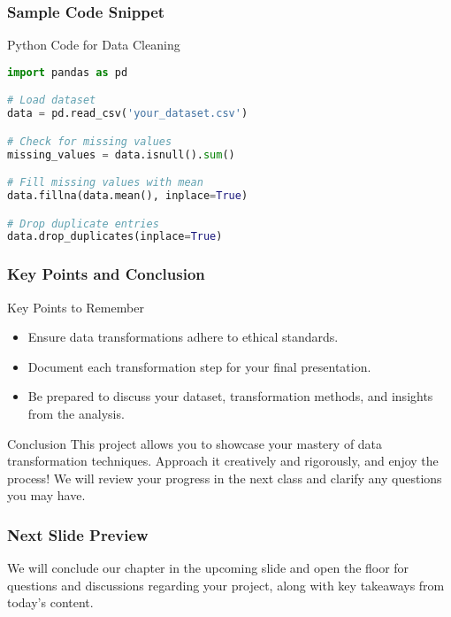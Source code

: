 \documentclass[aspectratio=169]{beamer}
\begin{document}
\begin{frame}[fragile]
    \frametitle{Sample Code Snippet}
    \begin{block}{Python Code for Data Cleaning}
        \begin{lstlisting}[language=Python]
import pandas as pd

# Load dataset
data = pd.read_csv('your_dataset.csv')

# Check for missing values
missing_values = data.isnull().sum()

# Fill missing values with mean
data.fillna(data.mean(), inplace=True)

# Drop duplicate entries
data.drop_duplicates(inplace=True)
        \end{lstlisting}
    \end{block}
\end{frame}

\begin{frame}[fragile]
    \frametitle{Key Points and Conclusion}
    \begin{block}{Key Points to Remember}
        \begin{itemize}
            \item Ensure data transformations adhere to ethical standards.
            \item Document each transformation step for your final presentation.
            \item Be prepared to discuss your dataset, transformation methods, and insights from the analysis.
        \end{itemize}
    \end{block}

    \begin{block}{Conclusion}
        This project allows you to showcase your mastery of data transformation techniques. Approach it creatively and rigorously, and enjoy the process!
        We will review your progress in the next class and clarify any questions you may have.
    \end{block}
\end{frame}

\begin{frame}[fragile]
    \frametitle{Next Slide Preview}
    We will conclude our chapter in the upcoming slide and open the floor for questions and discussions regarding your project, along with key takeaways from today's content.
\end{frame}
\end{document}

